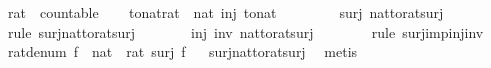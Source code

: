 \begin{isabellebody}
\endisatagproof
{\isafoldproof}%
%
\isadelimproof
\isanewline
%
\endisadelimproof
\isanewline
{}\isamarkupfalse%
\isanewline
\isanewline
{}\isamarkupfalse%
\ rat\ {\isacharcolon}{\isacharcolon}\ countable\isanewline
%
\isadelimproof
%
\endisadelimproof
%
\isatagproof
{}\isamarkupfalse%
\isanewline
\ \ \isamarkupfalse%
\ {\isachardoublequoteopen}{\isasymexists}to{\isacharunderscore}nat{\isacharcolon}{\isacharcolon}rat\ {\isasymRightarrow}\ nat{\isachardot}\ inj\ to{\isacharunderscore}nat{\isachardoublequoteclose}\isanewline
\ \ \isamarkupfalse%
\isanewline
\ \ \ \ \isamarkupfalse%
\ {\isachardoublequoteopen}surj\ nat{\isacharunderscore}to{\isacharunderscore}rat{\isacharunderscore}surj{\isachardoublequoteclose}\isanewline
\ \ \ \ \ \ \isamarkupfalse%
\ {\isacharparenleft}rule\ surj{\isacharunderscore}nat{\isacharunderscore}to{\isacharunderscore}rat{\isacharunderscore}surj{\isacharparenright}\isanewline
\ \ \ \ \isamarkupfalse%
\ \isamarkupfalse%
\ {\isachardoublequoteopen}inj\ {\isacharparenleft}inv\ nat{\isacharunderscore}to{\isacharunderscore}rat{\isacharunderscore}surj{\isacharparenright}{\isachardoublequoteclose}\isanewline
\ \ \ \ \ \ \isamarkupfalse%
\ {\isacharparenleft}rule\ surj{\isacharunderscore}imp{\isacharunderscore}inj{\isacharunderscore}inv{\isacharparenright}\isanewline
\ \ \isamarkupfalse%
\isanewline
{}\isamarkupfalse%
%
\endisatagproof
{\isafoldproof}%
%
\isadelimproof
\isanewline
%
\endisadelimproof
\isanewline
{}\isamarkupfalse%
\ rat{\isacharunderscore}denum{\isacharcolon}\ {\isachardoublequoteopen}{\isasymexists}f\ {\isacharcolon}{\isacharcolon}\ nat\ {\isasymRightarrow}\ rat{\isachardot}\ surj\ f{\isachardoublequoteclose}\isanewline
%
\isadelimproof
\ %
\endisadelimproof
%
\isatagproof
{}\isamarkupfalse%
\ surj{\isacharunderscore}nat{\isacharunderscore}to{\isacharunderscore}rat{\isacharunderscore}surj\ \isamarkupfalse%
\ metis%
\endisatagproof
{\isafoldproof}%
%
\isadelimproof
\isanewline
%
\endisadelimproof
%
\isadelimtheory
\isanewline
%
\endisadelimtheory
%
\isatagtheory
{}\isamarkupfalse%
%
\endisatagtheory
{\isafoldtheory}%
%
\isadelimtheory
%
\endisadelimtheory
%
\end{isabellebody}%
\endinput
